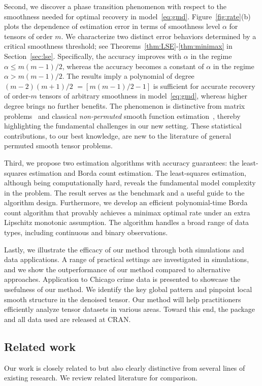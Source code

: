 \documentclass[12pt]{article}
\theoremstyle{definition}
\begin{document}
Second, we discover a phase transition phenomenon with respect to the smoothness needed for optimal recovery in model~\eqref{eq:gmd}. Figure~\ref{fig:rate}(b) plots the dependence of estimation error in terms of smoothness level $\alpha$ for tensors of order $m$. We characterize two distinct error behaviors determined by a critical smoothness threshold; see Theorems~\ref{thm:LSE}-\ref{thm:minimax} in Section~\ref{sec:lse}. Specifically, the accuracy improves with $\alpha$ in the regime $\alpha\leq m(m-1)/2$, whereas the accuracy becomes a constant of $\alpha$ in the regime $\alpha>m(m-1)/2$. The results imply a polynomial of degree $(m-2)(m+1)/2$ $=[m(m-1)/2-1]$ is sufficient for accurate recovery of order-$m$ tensors of arbitrary smoothness in model~\eqref{eq:gmd}, whereas higher degree brings no further benefits. The phenomenon is distinctive from matrix problems~\citep{klopp2017oracle,gao2015rate} and classical \emph{non-permuted} smooth function estimation~\cite{tsybakov2009introduction}, thereby highlighting the fundamental challenges in our new setting. These statistical contributions, to our best knowledge, are new to the literature of general permuted smooth tensor problems. 

Third, we propose two estimation algorithms with accuracy guarantees: the least-squares estimation and Borda count estimation. The least-squares estimation, although being computationally hard, reveals the fundamental model complexity in the problem. The result serves as the benchmark and a useful guide to the algorithm design. Furthermore, we develop an efficient polynomial-time Borda count algorithm that provably achieves a minimax optimal rate under {\color{blue} an extra Lipschitz monotonic assumption}. The algorithm handles a broad range of data types, including continuous and binary observations. 

Lastly, we illustrate the efficacy of our method through both simulations and data applications. A range of practical settings are investigated in simulations, and we show the outperformance of our method compared to alternative approaches.
Application to Chicago crime data is presented to showcase the usefulness of our method. We identify the key global pattern and pinpoint local smooth structure in the denoised tensor. Our method will help practitioners efficiently analyze tensor datasets in various areas. Toward this end, the package and all data used are released at CRAN.

\subsection{Related work}\label{sec:priorwork}
 Our work is closely related to but also clearly distinctive from several lines of existing research. We review related literature for comparison.
\end{document}
